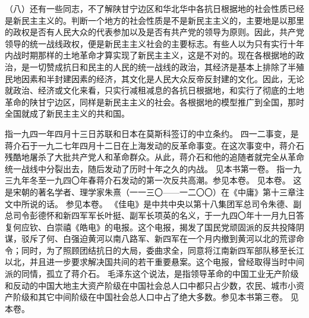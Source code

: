 （八）还有一些同志，不了解陕甘宁边区和华北华中各抗日根据地的社会性质已经是新民主主义的。判断一个地方的社会性质是不是新民主主义的，主要地是以那里的政权是否有人民大众的代表参加以及是否有共产党的领导为原则。因此，共产党领导的统一战线政权，便是新民主主义社会的主要标志。有些人以为只有实行十年内战时期那样的土地革命才算实现了新民主主义，这是不对的。现在各根据地的政治，是一切赞成抗日和民主的人民的统一战线的政治，其经济是基本上排除了半殖民地因素和半封建因素的经济，其文化是人民大众反帝反封建的文化。因此，无论就政治、经济或文化来看，只实行减租减息的各抗日根据地，和实行了彻底的土地革命的陕甘宁边区，同样是新民主主义的社会。各根据地的模型推广到全国，那时全国就成了新民主主义的共和国。


\begin{maonote}
指一九四一年四月十三日苏联和日本在莫斯科签订的中立条约。
四一二事变，是蒋介石于一九二七年四月十二日在上海发动的反革命事变。在这次事变中，蒋介石残酷地屠杀了大批共产党人和革命群众。从此，蒋介石和他的追随者就完全从革命统一战线中分裂出去，随后发动了历时十年之久的内战。
见本书第一卷。
指一九三九年冬至一九四〇年春蒋介石发动的第一次反共高潮。参见本卷。
见本卷。
这是宋朝的著名学者、理学家朱熹（一一三〇——一二〇〇）在《中庸》第十三章注文中所说的话。
参见本卷。
《佳电》是中共中央以第十八集团军总司令朱德、副总司令彭德怀和新四军军长叶挺、副军长项英的名义，于一九四〇年十一月九日答复何应钦、白崇禧《皓电》的电报。这个电报，揭发了国民党顽固派的反共投降阴谋，驳斥了何、白强迫黄河以南八路军、新四军在一个月内撤到黄河以北的荒谬命令；同时，为了照顾团结抗日的大局，委曲求全，同意将江南新四军部队移至长江以北，并且进一步要求解决国共间的若干重要悬案。这个电报，曾经取得当时中间派的同情，孤立了蒋介石。
毛泽东这个说法，是指领导革命的中国工业无产阶级和反动的中国大地主大资产阶级在中国社会总人口中都只占少数，农民、城市小资产阶级和其它中间阶级在中国社会总人口中占了绝大多数。参见本书第三卷。
见本卷。
\end{maonote}
